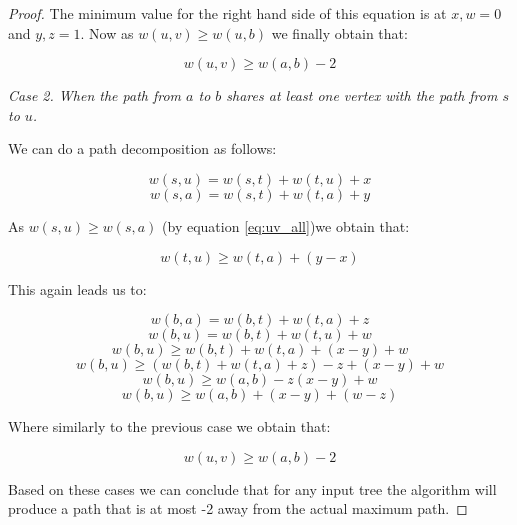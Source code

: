 \begin{proof}
The minimum value for the right hand side of this equation is at $x, w = 0$ and $y, z = 1$. Now as $w(u, v) \ge w(u, b)$ we finally obtain that:

$$ w(u, v) \ge w(a, b) - 2 $$


{\em Case 2. When the path from $a$ to $b$ shares at least one vertex with the path from $s$ to $u$.}


We can do a path decomposition as follows:

$$ w(s, u) = w(s, t) + w(t, u) + x $$
$$ w(s, a) = w(s, t) + w(t, a) + y $$

As $w(s, u) \ge w(s, a)$ (by equation \ref{eq:uv_all})we obtain that:

$$ w(t, u) \ge w(t, a) + (y - x) $$

This again leads us to:

$$ w(b, a) = w(b, t) + w(t, a) + z  $$
$$ w(b, u) = w(b, t) + w(t, u) + w  $$
$$ w(b, u) \ge w(b, t) + w(t, a) + (x - y) + w $$
$$ w(b, u) \ge (w(b, t) + w(t, a) + z) - z + (x - y) + w $$
$$ w(b, u) \ge w(a, b) - z (x - y) + w $$
$$ w(b, u) \ge w(a, b) + (x - y) + (w - z) $$

Where similarly to the previous case we obtain that:

$$ w(u, v) \ge w(a, b) - 2 $$


Based on these cases we can conclude that for any input tree the algorithm will produce a path that is at most -2 away from the actual maximum path.




\end{proof}

\cite{parikh1980adaptive}
